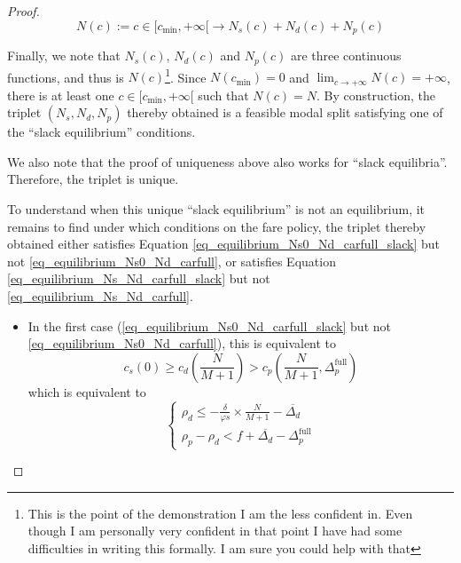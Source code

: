 \documentclass[english, a4paper]{article}
\theoremstyle{plain}
\theoremstyle{definition}
\theoremstyle{remark}
\begin{document}
\begin{proof}
    \begin{equation}
        N(c):= c\in [c_{\text{min}}, +\infty[ \longrightarrow N_s(c) + N_d(c) + N_p(c)
    \end{equation}

    Finally, we note that $N_s(c)$, $N_d(c)$ and $N_p(c)$ are three continuous functions, and thus is $N(c)$\footnote{This is the point of the demonstration I am the less confident in. Even though I am personally very confident in that point I have had some difficulties in writing this formally. I am sure you could help with that}. Since $N(c_{\text{min}}) = 0$ and $\lim_{c\rightarrow +\infty} N(c) = +\infty$, there is at least one $c\in [c_{\text{min}}, +\infty[$ such that $N(c) = N$. By construction, the triplet $(N_s, N_d, N_p)$ thereby obtained is a feasible modal split satisfying one of the ``slack equilibrium'' conditions.

    We also note that the proof of uniqueness above also works for ``slack equilibria''. Therefore, the triplet is unique.
    
    To understand when this unique ``slack equilibrium'' is not an equilibrium, it remains to find under which conditions on the fare policy, the triplet thereby obtained either satisfies Equation \ref{eq_equilibrium_Ns0_Nd_carfull_slack} but not \ref{eq_equilibrium_Ns0_Nd_carfull}, or satisfies Equation \ref{eq_equilibrium_Ns_Nd_carfull_slack} but not \ref{eq_equilibrium_Ns_Nd_carfull}.

    \begin{itemize}
        \item In the first case (\ref{eq_equilibrium_Ns0_Nd_carfull_slack} but not \ref{eq_equilibrium_Ns0_Nd_carfull}), this is equivalent to
        \begin{equation}
            c_s(0) \geq c_d \left(\frac{N}{M+1}\right) > c_p\left(\frac{N}{M+1}, \Delta _p^{\text{full}}\right)
        \end{equation}which is equivalent to
        \begin{equation}
            \left\{
            \begin{array}{l}
                \rho _d \leq - \frac{\delta}{\varphi s}\times \frac{N}{M+1} - \overline{\Delta _d}\\
                \rho _p - \rho _d < f + \overline{\Delta _d} - \Delta _p^{\text{full}}
            \end{array}
            \right.
        \end{equation}


\end{itemize}
\end{proof}
\end{document}
